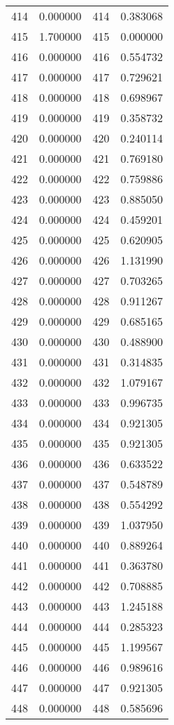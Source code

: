 \documentclass[12pt]{article}
\begin{document}
\begin{longtable}{@{}cccc@{}}
414 & 0.000000 & 414 & 0.383068 \\
415 & 1.700000 & 415 & 0.000000 \\
416 & 0.000000 & 416 & 0.554732 \\
417 & 0.000000 & 417 & 0.729621 \\
418 & 0.000000 & 418 & 0.698967 \\
419 & 0.000000 & 419 & 0.358732 \\
420 & 0.000000 & 420 & 0.240114 \\
421 & 0.000000 & 421 & 0.769180 \\
422 & 0.000000 & 422 & 0.759886 \\
423 & 0.000000 & 423 & 0.885050 \\
424 & 0.000000 & 424 & 0.459201 \\
425 & 0.000000 & 425 & 0.620905 \\
426 & 0.000000 & 426 & 1.131990 \\
427 & 0.000000 & 427 & 0.703265 \\
428 & 0.000000 & 428 & 0.911267 \\
429 & 0.000000 & 429 & 0.685165 \\
430 & 0.000000 & 430 & 0.488900 \\
431 & 0.000000 & 431 & 0.314835 \\
432 & 0.000000 & 432 & 1.079167 \\
433 & 0.000000 & 433 & 0.996735 \\
434 & 0.000000 & 434 & 0.921305 \\
435 & 0.000000 & 435 & 0.921305 \\
436 & 0.000000 & 436 & 0.633522 \\
437 & 0.000000 & 437 & 0.548789 \\
438 & 0.000000 & 438 & 0.554292 \\
439 & 0.000000 & 439 & 1.037950 \\
440 & 0.000000 & 440 & 0.889264 \\
441 & 0.000000 & 441 & 0.363780 \\
442 & 0.000000 & 442 & 0.708885 \\
443 & 0.000000 & 443 & 1.245188 \\
444 & 0.000000 & 444 & 0.285323 \\
445 & 0.000000 & 445 & 1.199567 \\
446 & 0.000000 & 446 & 0.989616 \\
447 & 0.000000 & 447 & 0.921305 \\
448 & 0.000000 & 448 & 0.585696 \\

\end{longtable}
\end{document}
